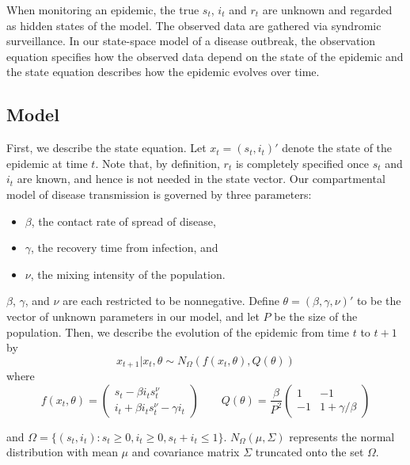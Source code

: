 \documentclass{elsarticle}
\begin{document}
When monitoring an epidemic, the true $s_t$, $i_t$ and $r_t$ are unknown and regarded as hidden states of the model. The observed data are gathered via syndromic surveillance. In our state-space model of a disease outbreak, the observation equation specifies how the observed data depend on the state of the epidemic and the state equation describes how the epidemic evolves over time.

\subsection{Model \label{sec:model}}

First, we describe the state equation. Let $x_t = (s_t,i_t)'$ denote the state of the epidemic at time $t$. Note that, by definition, $r_t$ is completely specified once $s_t$ and $i_t$ are known, and hence is not needed in the state vector. Our compartmental model of disease transmission is governed by three parameters:

\begin{itemize}
\item $\beta$, the contact rate of spread of disease,
\item $\gamma$, the recovery time from infection, and
\item $\nu$, the mixing intensity of the population.
\end{itemize}

\noindent $\beta$, $\gamma$, and $\nu$ are each restricted to be nonnegative. Define $\theta = (\beta,\gamma,\nu)'$ to be the vector of unknown parameters in our model, and let $P$ be the size of the population. Then, we describe the evolution of the epidemic from time $t$ to $t + 1$ by
\begin{equation}
x_{t+1}\left|x_t,\theta\right. \sim N_\Omega\left(f(x_t,\theta),Q(\theta)\right) \label{eqn:state}
\end{equation}
\noindent where
\[
f(x_t,\theta) = \left(
\begin{array}{c}
s_t - \beta i_ts^{\nu}_t \phantom{- \gamma i_t}\,\, \\
i_t +  \beta i_ts^\nu_t - \gamma i_t
\end{array}
\right)
\qquad
Q(\theta) = \frac{\beta}{P^2} \left(
\begin{array}{ccccc}
1 & -1 \\
-1 & 1 + \gamma/\beta
\end{array}
\right)
\]

\noindent and $\Omega = \{(s_t,i_t): s_t \ge 0, i_t \ge 0, s_t + i_t \le 1\}$. $N_{\Omega}(\mu,\Sigma)$ represents the normal distribution with mean $\mu$ and covariance matrix $\Sigma$ truncated onto the set $\Omega$. %
\end{document}
